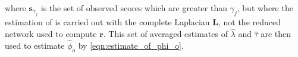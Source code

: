     \noindent where $\mathbf{s}_{\gamma_j}$ is the set of observed
    scores which are greater than $\gamma_j$, but where the estimation
    of is carried out with the complete Laplacian $\mathbf{L}$,
    not the reduced network used to compute $\mathbf{r}$. This set of
    averaged estimates of ${\hat \lambda}$ and ${\hat \tau}$ are then
    used to estimate ${\hat \phi_o}$ by \eqref{eqn:estimate_of_phi_o}.